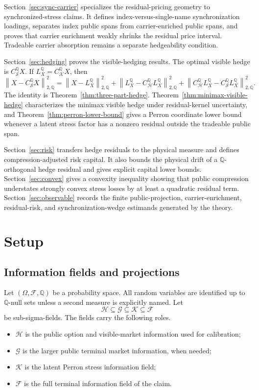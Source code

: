 \documentclass[11pt,a4paper]{amsart}
\theoremstyle{plain}
\theoremstyle{definition}
\theoremstyle{remark}
\newcommand{\QQ}{\mathbb{Q}}
\newcommand{\cF}{\mathcal{F}}
\newcommand{\cG}{\mathcal{G}}
\newcommand{\cH}{\mathcal{H}}
\newcommand{\cK}{\mathcal{K}}
\newcommand{\cS}{\mathcal{S}}
\newcommand{\norm}[1]{\left\lVert #1\right\rVert}
\begin{document}
Section~\ref{sec:sync-carrier} specializes the residual-pricing geometry to synchronized-stress
claims.  It defines index-versus-single-name synchronization loadings, separates index public spans
from carrier-enriched public spans, and proves that carrier enrichment weakly shrinks the residual
price interval.  Tradeable carrier absorption remains a separate hedgeability condition.

Section~\ref{sec:hedging} proves the visible-hedging results.  The optimal visible hedge is
\(C_{\cS}^{\QQ}X\).  If \(L_X^\QQ=C_{\cK}^{\QQ}X\), then
\[
        \norm{X-C_{\cS}^{\QQ}X}_{2,\QQ}^2
        =
        \norm{X-L_X^\QQ}_{2,\QQ}^2
        +
        \norm{L_X^\QQ-C_{\cH}^{\QQ}L_X^\QQ}_{2,\QQ}^2
        +
        \norm{C_{\cH}^{\QQ}L_X^\QQ-C_{\cS}^{\QQ}L_X^\QQ}_{2,\QQ}^2.
\]
The identity is Theorem~\ref{thm:three-part-hedge}.  Theorem~\ref{thm:minimax-visible-hedge}
characterizes the minimax visible hedge under residual-kernel uncertainty, and
Theorem~\ref{thm:perron-lower-bound} gives a Perron coordinate lower bound whenever a latent stress
factor has a nonzero residual outside the tradeable public span.

Section~\ref{sec:risk} transfers hedge residuals to the physical measure and defines
compression-adjusted risk capital.  It also bounds the physical drift of a \(\QQ\)-orthogonal hedge
residual and gives explicit capital lower bounds.  Section~\ref{sec:convex} gives a convexity
inequality showing that public compression understates strongly convex stress losses by at least a
quadratic residual term.  Section~\ref{sec:observable} records the finite public-projection,
carrier-enrichment, residual-risk, and synchronization-wedge estimands generated by the theory.

\section{Setup}\label{sec:setup}

\subsection{Information fields and projections}

Let \((\Omega,\cF,\QQ)\) be a probability space.  All random variables are identified up to
\(\QQ\)-null sets unless a second measure is explicitly named.  Let
\[
        \cH\subseteq \cG\subseteq \cK\subseteq \cF
\]
be sub-sigma-fields.  The fields carry the following roles.

\begin{itemize}[leftmargin=2em]
\item \(\cH\) is the public option and visible-market information used for calibration;
\item \(\cG\) is the larger public terminal market information, when needed;
\item \(\cK\) is the latent Perron stress information field;
\item \(\cF\) is the full terminal information field of the claim.
\end{itemize}
\end{document}
